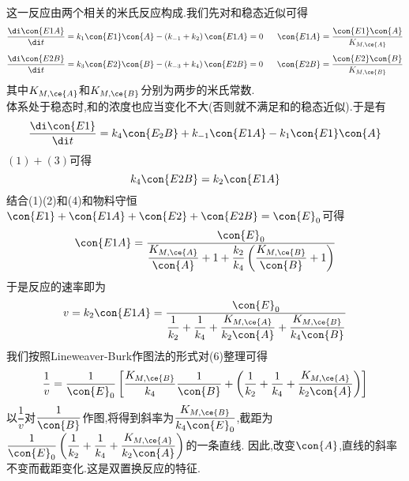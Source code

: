 \documentclass{ctexart}
\begin{document}
\begin{derivation}\setcounter{equation}{0}
    这一反应由两个相关的米氏反应构成.我们先对和稳态近似可得
    \begin{equation}
        \dfrac{\di\con{E1A}}{\di t}=k_1\con{E1}\con{A}-\left(k_{-1}+k_2\right)\con{E1A}=0\ \ \ \ \ \con{E1A}=\dfrac{\con{E1}\con{A}}{K_{M,\ce{A}}}
    \end{equation}
    \begin{equation}
        \dfrac{\di\con{E2B}}{\di t}=k_3\con{E2}\con{B}-\left(k_{-3}+k_4\right)\con{E2B}=0\ \ \ \ \ \con{E2B}=\dfrac{\con{E2}\con{B}}{K_{M,\ce{B}}}
    \end{equation}
    其中$K_{M,\ce{A}}$和$K_{M,\ce{B}}$分别为两步的米氏常数.\\
    体系处于稳态时,和的浓度也应当变化不大(否则就不满足和的稳态近似).于是有
    \begin{equation}
        \dfrac{\di\con{E1}}{\di t}=k_4\con{E_2B}+k_{-1}\con{E1A}-k_1\con{E1}\con{A}
    \end{equation}
    $(1)+(3)$可得
    \begin{equation}
        k_4\con{E2B}=k_2\con{E1A}
    \end{equation}
    结合(1)(2)和(4)和物料守恒$\con{E1}+\con{E1A}+\con{E2}+\con{E2B}=\con{E}_0$可得
    \begin{equation}
        \con{E1A}=\dfrac{\con{E}_0}{\dfrac{K_{M,\ce{A}}}{\con{A}}+1+\dfrac{k_2}{k_4}\left(\dfrac{K_{M,\ce{B}}}{\con{B}}+1\right)}
    \end{equation}
    于是反应的速率即为
    \begin{equation}
        v=k_2\con{E1A}=\dfrac{\con{E}_0}{\dfrac{1}{k_2}+\dfrac{1}{k_4}+\dfrac{K_{M,\ce{A}}}{k_2\con{A}}+\dfrac{K_{M,\ce{B}}}{k_4\con{B}}}
    \end{equation}
    我们按照Lineweaver-Burk作图法的形式对(6)整理可得
    \begin{equation}
        \dfrac{1}{v}=\dfrac{1}{\con{E}_0}\left[\dfrac{K_{M,\ce{B}}}{k_4}\dfrac{1}{\con{B}}+\left(\dfrac{1}{k_2}+\dfrac{1}{k_4}+\dfrac{K_{M,\ce{A}}}{k_2\con{A}}\right)\right]
    \end{equation}
    以$\dfrac1v$对$\dfrac{1}{\con{B}}$作图,将得到斜率为$\dfrac{K_{M,\ce{B}}}{k_4\con{E}_0}$,截距为$\dfrac{1}{\con{E}_0}\left(\dfrac{1}{k_2}+\dfrac{1}{k_4}+\dfrac{K_{M,\ce{A}}}{k_2\con{A}}\right)$的一条直线.%
    因此,改变$\con{A}$,直线的斜率不变而截距变化.这是双置换反应的特征.
\end{derivation}
\end{document}
